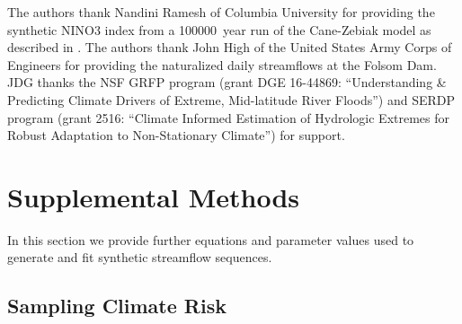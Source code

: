 \documentclass[
  draft,
  linenumbers
]{agujournal2018}
\begin{document}

\acknowledgments

The authors thank Nandini Ramesh of Columbia University for providing the synthetic NINO3 index from a \SI{100000}{year} run of the Cane-Zebiak model as described in \citet{Ramesh:2016hf}.
The authors thank John High of the United States Army Corps of Engineers for providing the naturalized daily streamflows at the Folsom Dam.
JDG thanks the NSF GRFP program (grant DGE 16-44869: ``Understanding \& Predicting Climate Drivers of Extreme, Mid-latitude River Floods'') and SERDP program (grant 2516: ``Climate Informed Estimation of Hydrologic Extremes for Robust Adaptation to Non-Stationary Climate'') for support.




\clearpage
\appendix

\renewcommand{\thefigure}{S\arabic{figure}}
\setcounter{figure}{0}
\renewcommand{\theequation}{S\arabic{equation}}
\setcounter{equation}{0}
\renewcommand{\thetable}{S\arabic{table}}
\setcounter{table}{0}

\section{Supplemental Methods}\label{sec:supp-methods}

In this section we provide further equations and parameter values used to generate and fit synthetic streamflow sequences.

\subsection{Sampling Climate Risk}\label{sec:supp-nino-spectrum}
\end{document}
